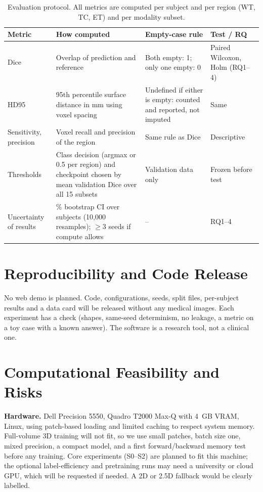 \documentclass[11pt,a4paper]{article}
\begin{document}
\begin{table}[ht]
\centering\small
\caption{Evaluation protocol. All metrics are computed per subject and per region (WT, TC, ET) and per modality subset.}
\label{tab:eval}
\begin{tabularx}{\linewidth}{@{}>{\raggedright\arraybackslash}p{2.3cm}>{\raggedright\arraybackslash}X>{\raggedright\arraybackslash}X>{\raggedright\arraybackslash}p{2.6cm}@{}}
\toprule
\rowcolor{accentlight}\textbf{Metric} & \textbf{How computed} & \textbf{Empty-case rule} & \textbf{Test / RQ} \\
\midrule
Dice & Overlap of prediction and reference & Both empty: 1; only one empty: 0 & Paired Wilcoxon, Holm (RQ1--4) \\
HD95 & 95th percentile surface distance in mm using voxel spacing & Undefined if either is empty: counted and reported, not imputed & Same \\
Sensitivity, precision & Voxel recall and precision of the region & Same rule as Dice & Descriptive \\
Thresholds & Class decision (argmax or 0.5 per region) and checkpoint chosen by mean validation Dice over all 15 subsets & Validation data only & Frozen before test \\
Uncertainty of results & 95\% bootstrap CI over subjects (10{,}000 resamples); $\geq3$ seeds if compute allows & -- & RQ1--4 \\
\bottomrule
\end{tabularx}
\end{table}

\section{Reproducibility and Code Release}
No web demo is planned. Code, configurations, seeds, split files, per-subject results and a data card will be released without any medical images. Each experiment has a check (shapes, same-seed determinism, no leakage, a metric on a toy case with a known answer). The software is a research tool, not a clinical one.

\section{Computational Feasibility and Risks}
\textbf{Hardware.} Dell Precision 5550, Quadro T2000 Max-Q with 4~GB VRAM, Linux, using patch-based loading and limited caching to respect system memory. Full-volume 3D training will not fit, so we use small patches, batch size one, mixed precision, a compact model, and a first forward/backward memory test before any training. Core experiments (S0--S2) are planned to fit this machine; the optional label-efficiency and pretraining runs may need a university or cloud GPU, which will be requested if needed. A 2D or 2.5D fallback would be clearly labelled.
\end{document}
